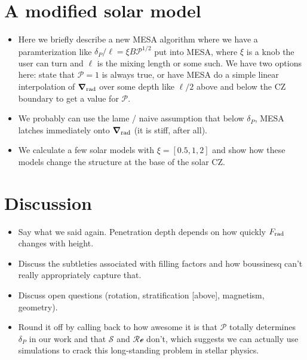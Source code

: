 \documentclass[12pt]{article}
\renewcommand{\vec}[1]{\boldsymbol{#1}}
\newcommand{\grad}{\vec{\nabla}}
\begin{document}
\section{A modified solar model}
\begin{itemize}
\item Here we briefly describe a new MESA algorithm where we have a paramterization like $\delta_P/\ell = \xi B \mathcal{P}^{1/2}$ put into MESA, where $\xi$ is a knob the user can turn and $\ell$ is the mixing length or some such.
We have two options here: state that $\mathcal{P} = 1$ is always true, or have MESA do a simple linear interpolation of $\grad_{\rm{rad}}$ over some depth like $\ell/2$ above and below the CZ boundary to get a value for $\mathcal{P}$.
\item We probably can use the lame / naive assumption that below $\delta_P$, MESA latches immediately onto $\grad_{\rm{rad}}$ (it is stiff, after all).
\item We calculate a few solar models with $\xi = [0.5, 1, 2]$ and show how these models change the structure at the base of the solar CZ.
\end{itemize}

\section{Discussion}
\begin{itemize}
\item Say what we said again.
Penetration depth depends on how quickly $F_{\rm{rad}}$ changes with height.
\item Discuss the subtleties associated with filling factors and how boussinesq can't really appropriately capture that.
\item Discuss open questions (rotation, stratification [above], magnetism, geometry).
\item Round it off by calling back to how awesome it is that $\mathcal{P}$ totally determines $\delta_P$ in our work and that $\mathcal{S}$ and $\mathcal{Re}$ don't, which suggests we can actually use simulations to crack this long-standing problem in stellar physics.
\end{itemize}


\end{document}
